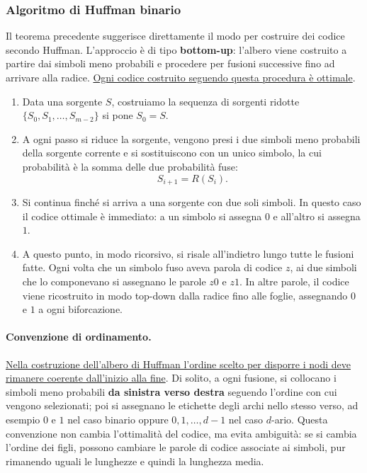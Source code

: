 \documentclass{article}
\theoremstyle{definition}
\numberwithin{equation}{section}
\begin{document}
\subsubsection{Algoritmo di Huffman binario}
Il teorema precedente suggerisce direttamente il modo per costruire dei codice secondo Huffman. L'approccio è di tipo \textbf{bottom-up}: l'albero viene costruito a partire dai simboli meno probabili e procedere per fusioni successive fino ad arrivare alla radice. \uline{Ogni codice costruito seguendo questa procedura è ottimale}.
\begin{enumerate}
    \item Data una sorgente $S$, costruiamo la sequenza di sorgenti ridotte $\{S_0, S_1, \ldots, S_{m-2}\}$ si pone $S_0=S$.
    \item A ogni passo si riduce la sorgente, vengono presi i due simboli meno probabili della sorgente corrente e si sostituiscono con un unico simbolo, la cui probabilità è la somma delle due probabilità fuse:
          \[
              S_{i+1}=R(S_i).
          \]
    \item Si continua finché si arriva a una sorgente con due soli simboli. In questo caso il codice ottimale è immediato: a un simbolo si assegna $0$ e all'altro si assegna $1$.
    \item A questo punto, in modo ricorsivo, si risale all'indietro lungo tutte le fusioni fatte. Ogni volta che un simbolo fuso aveva parola di codice $z$, ai due simboli che lo componevano si assegnano le parole $z0$ e $z1$. In altre parole, il codice viene ricostruito in modo top-down dalla radice fino alle foglie, assegnando $0$ e $1$ a ogni biforcazione.
\end{enumerate}
\paragraph{Convenzione di ordinamento.}
\uline{Nella costruzione dell'albero di Huffman l'ordine scelto per disporre i nodi deve rimanere coerente dall'inizio alla fine}. Di solito, a ogni fusione, si collocano i simboli meno probabili \textbf{da sinistra verso destra} seguendo l'ordine con cui vengono selezionati; poi si assegnano le etichette degli archi nello stesso verso, ad esempio $0$ e $1$ nel caso binario oppure $0,1,\ldots,d-1$ nel caso $d$-ario. Questa convenzione non cambia l'ottimalità del codice, ma evita ambiguità: se si cambia l'ordine dei figli, possono cambiare le parole di codice associate ai simboli, pur rimanendo uguali le lunghezze e quindi la lunghezza media.
\end{document}
